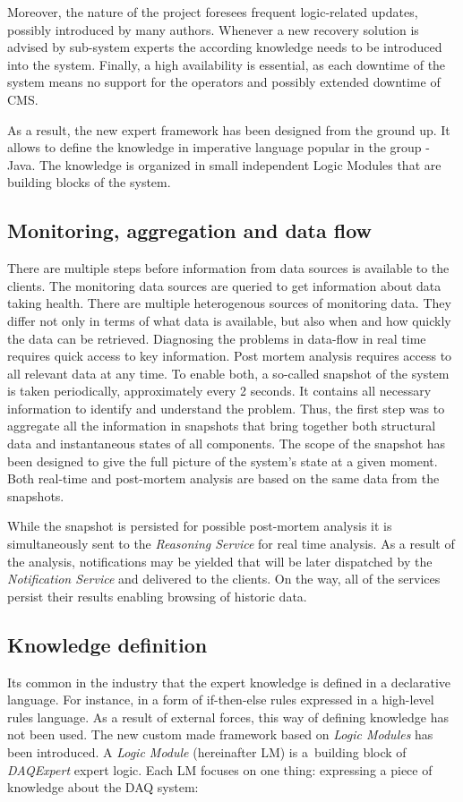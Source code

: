 \documentclass[a4paper]{jpconf}
\begin{document}
Moreover, the nature of the project foresees frequent logic-related updates, possibly introduced by many authors. Whenever a new recovery solution is advised by sub-system experts the according knowledge needs to be introduced into the system. Finally, a high availability is essential, as each downtime of the system means no support for the operators and possibly extended downtime of CMS. 

As a result, the new expert framework has been designed from the ground up. It allows to define the knowledge in imperative language popular in the group - Java. The knowledge is organized in small independent Logic Modules that are building blocks of the system.


\subsection{Monitoring, aggregation and data flow}

There are multiple steps before information from data sources is available to the clients. The monitoring data sources are queried to get information about data taking health. There are multiple heterogenous sources of monitoring data. They differ not only in terms of what data is available, but also when and how quickly the data can be retrieved. Diagnosing the problems in data-flow in real time requires quick access to key information. Post mortem analysis requires access to all relevant data at any time. To enable both, a so-called snapshot of the system is taken periodically, approximately every 2 seconds. It contains all necessary information to identify and understand the problem. Thus, the first step was to aggregate all the information in snapshots that bring together both structural data and instantaneous states of all components. The scope of the snapshot has been designed to give the full picture of the system's state at a given moment. Both real-time and post-mortem analysis are based on the same data from the snapshots.

While the snapshot is persisted for possible post-mortem analysis it is simultaneously sent to the {\it Reasoning Service} for real time analysis. As a result of the analysis, notifications may be yielded that will be later dispatched by the {\it Notification Service} and delivered to the clients. On the way, all of the services persist their results enabling browsing of historic data.


\subsection{Knowledge definition}
Its common in the industry that the expert knowledge is defined in a declarative language. For instance, in a form of if-then-else rules expressed in a high-level rules language. As a result of external forces, this way of defining knowledge has not been used. The new custom made framework based on {\it Logic Modules} has been introduced. A {\it Logic Module} (hereinafter LM) is a~building block of {\it DAQExpert} expert logic. Each LM focuses on one thing: expressing a piece of knowledge about the DAQ system:
\end{document}
